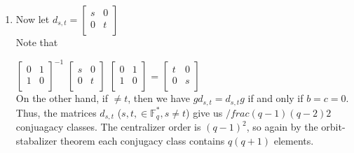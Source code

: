 \documentclass[12pt,twoside]{reedthesis}
\theoremstyle{definition}\newtheorem{definition}{Definition}
\theoremstyle{definition}\newtheorem{example}{Example}
\begin{document}
\begin{enumerate}
\item 
Now let $d_{s,t} =
\begin{bmatrix}
s&0\\
0&t\\
\end{bmatrix}$\\

Note that

$
\begin{bmatrix}
0&1\\
1&0\\
\end{bmatrix}^{-1}
$
$
\begin{bmatrix}
s&0\\
0&t\\
\end{bmatrix}
$
$
\begin{bmatrix}
0&1\\
1&0\\
\end{bmatrix}
$
=
$
\begin{bmatrix}
t&0\\
0&s\\
\end{bmatrix}
$\\

On the other hand, if $\neq{t}$, then we have $gd_{s,t} = d_{s,t}g$ if and only if $b=c=0.$  Thus, the matrices $d_{s,t}$ ($s,t, \in{\mathbb{F}^*_q}, s\neq{t}$) 
give us $/frac{(q-1)(q-2)}{2}$ conjuagacy classes.  The centralizer order is $(q-1)^2$, so again by the orbit-stabalizer theorem each conjugacy class contains $q(q+1)$
elements. 





\end{enumerate}
\end{document}
